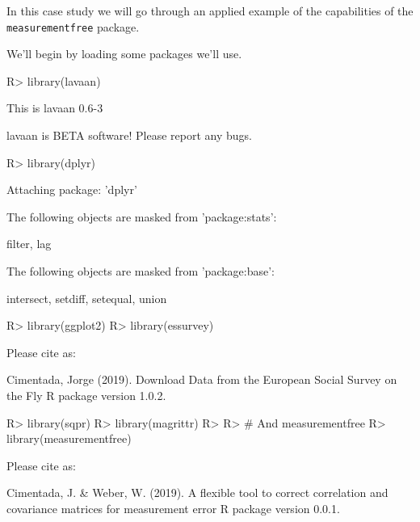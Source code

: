 \documentclass[
]{jss}
\begin{document}
In this case study we will go through an applied example of the
capabilities of the \texttt{measurementfree} package.

We'll begin by loading some packages we'll use.

\begin{CodeChunk}

\begin{CodeInput}
R> library(lavaan)
\end{CodeInput}

\begin{CodeOutput}
This is lavaan 0.6-3
\end{CodeOutput}

\begin{CodeOutput}
lavaan is BETA software! Please report any bugs.
\end{CodeOutput}

\begin{CodeInput}
R> library(dplyr)
\end{CodeInput}

\begin{CodeOutput}

Attaching package: 'dplyr'
\end{CodeOutput}

\begin{CodeOutput}
The following objects are masked from 'package:stats':

    filter, lag
\end{CodeOutput}

\begin{CodeOutput}
The following objects are masked from 'package:base':

    intersect, setdiff, setequal, union
\end{CodeOutput}

\begin{CodeInput}
R> library(ggplot2)
R> library(essurvey)
\end{CodeInput}

\begin{CodeOutput}

Please cite as: 
\end{CodeOutput}

\begin{CodeOutput}
Cimentada, Jorge (2019). Download Data from the European Social Survey on the Fly R package version 1.0.2.
\end{CodeOutput}

\begin{CodeInput}
R> library(sqpr)
R> library(magrittr)
R> 
R> # And measurementfree
R> library(measurementfree)
\end{CodeInput}

\begin{CodeOutput}

Please cite as: 
\end{CodeOutput}

\begin{CodeOutput}
Cimentada, J. & Weber, W. (2019). A flexible tool to correct correlation and covariance matrices for measurement error R package version 0.0.1.
\end{CodeOutput}
\end{CodeChunk}
\end{document}

